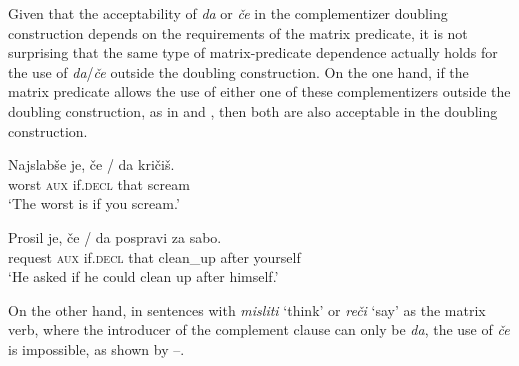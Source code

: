 \documentclass[output=paper,
]{langscibook}
\begin{document}
\noindent Given that the acceptability of \textit{da} or \textit{če} in the complementizer doubling construction depends on the requirements of the matrix predicate, it is not surprising that the same type of matrix-predicate dependence actually holds for the use of \textit{da}/\textit{če} outside the doubling construction. On the one hand, if the matrix predicate allows the use of either one of these complementizers outside the doubling construction, as in  and , then both are also acceptable in the doubling construction. 

\begin{exe} 
\ex \label{ex:plesnicar:twentyfive}
\gll Najslabše 	je, 	če / \hspace{-2pt} da 		kričiš.\\
  worst		\textsc{aux}	if.\textsc{decl} {} {} that	scream\\
\trans `The worst is if you scream.'
\end{exe}


\begin{exe} 
\ex \label{ex:plesnicar:twentysix}
\gll Prosil 		je, 	če / \hspace{-2pt} da 		pospravi 	za 	sabo.\\
 request		\textsc{aux}	if.\textsc{decl} {} {} that	clean\_up 	after	yourself \\
\trans `He asked if he could clean up after himself.'
\end{exe}

\noindent On the other hand, in sentences with \textit{misliti} `think' or \textit{reči} `say' as the matrix verb, where the introducer of the complement clause can only be \textit{da}, the use of \textit{če} is impossible, as shown by --. 

\begin{exe} 
\end{exe}


\begin{exe} 
\end{exe}
\end{document}
